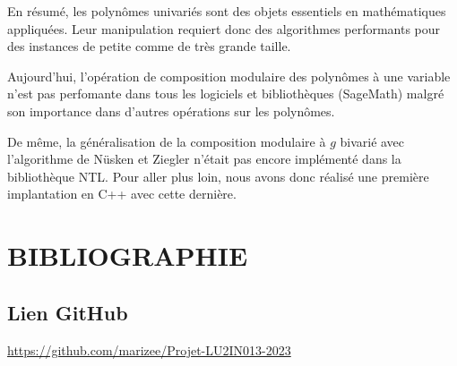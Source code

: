 \documentclass[a4paper]{article}
\begin{document}
En résumé, les polynômes univariés sont des objets essentiels en mathématiques appliquées. Leur manipulation requiert donc des algorithmes performants pour 
des instances de petite comme de très grande taille.

Aujourd'hui, l'opération de composition modulaire des polynômes à une variable n'est pas perfomante dans tous les logiciels et bibliothèques (SageMath) malgré son importance dans d'autres opérations sur les polynômes.

De même, la généralisation de la composition modulaire à $g$ bivarié avec l'algorithme de Nüsken et Ziegler n'était pas encore implémenté dans la bibliothèque NTL. Pour aller plus loin, nous avons donc réalisé une première implantation en C++ avec cette dernière.






\newpage
\section{BIBLIOGRAPHIE}

\nocite{*}




\subsection*{Lien GitHub} 
\url{https://github.com/marizee/Projet-LU2IN013-2023}
\end{document}
